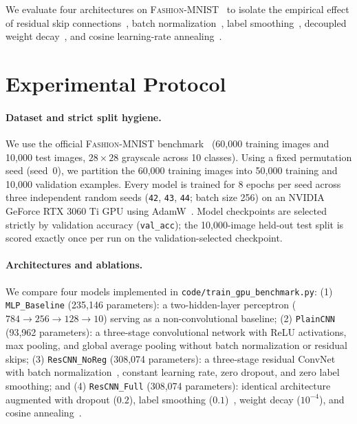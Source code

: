 \documentclass{article}
\begin{document}
We evaluate four architectures on \textsc{Fashion-MNIST}~\citep{xiao2017fashion} to isolate the empirical effect of residual skip connections~\citep{he2015deep}, batch normalization~\citep{ioffe2015batch}, label smoothing~\citep{szegedy2015rethinking}, decoupled weight decay~\citep{loshchilov2017decoupled}, and cosine learning-rate annealing~\citep{loshchilov2016sgdr}.

\section{Experimental Protocol}
\paragraph{Dataset and strict split hygiene.}
We use the official \textsc{Fashion-MNIST} benchmark~\citep{xiao2017fashion} (60,000 training images and 10,000 test images, $28\times 28$ grayscale across 10 classes).
Using a fixed permutation seed (seed~0), we partition the 60,000 training images into 50,000 training and 10,000 validation examples.
Every model is trained for 8 epochs per seed across three independent random seeds (\texttt{42}, \texttt{43}, \texttt{44}; batch size 256) on an NVIDIA GeForce RTX 3060 Ti GPU using AdamW~\citep{loshchilov2017decoupled}.
Model checkpoints are selected strictly by validation accuracy (\texttt{val\_acc}); the 10,000-image held-out test split is scored exactly once per run on the validation-selected checkpoint.

\paragraph{Architectures and ablations.}
We compare four models implemented in \texttt{code/train\_gpu\_benchmark.py}:
(1) \texttt{MLP\_Baseline} (235,146 parameters): a two-hidden-layer perceptron ($784\to 256\to 128\to 10$) serving as a non-convolutional baseline;
(2) \texttt{PlainCNN} (93,962 parameters): a three-stage convolutional network with ReLU activations, max pooling, and global average pooling without batch normalization or residual skips;
(3) \texttt{ResCNN\_NoReg} (308,074 parameters): a three-stage residual ConvNet with batch normalization~\citep{he2015deep,ioffe2015batch}, constant learning rate, zero dropout, and zero label smoothing; and
(4) \texttt{ResCNN\_Full} (308,074 parameters): identical architecture augmented with dropout ($0.2$), label smoothing ($0.1$)~\citep{szegedy2015rethinking}, weight decay ($10^{-4}$), and cosine annealing~\citep{loshchilov2016sgdr}.
\end{document}

